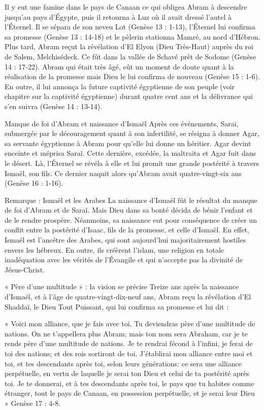 Il y eut une famine dans le pays de Canaan ce qui obligea Abram à descendre jusqu'au pays d’Égypte, puis il retourna à Luz où il avait dressé l'autel à l’Éternel. Il se sépara de son neveu Lot (Genèse 13 : 1-13), l’Éternel lui confirma sa promesse (Genèse 13 : 14-18) et le pèlerin stationna Mamré, au nord d'Hébron. Plus tard, Abram reçut la révélation d'El Elyon (Dieu Très-Haut) auprès du roi de Salem, Melchisédeck. Ce fût dans la vallée de Schavé prêt de Sodome (Genèse 14 : 17-22).
Abram qui était très âgé, eût un moment de doute quant à la réalisation de la promesse mais Dieu le lui confirma de nouveau (Genèse 15 : 1-6). En outre, il lui annonça la future captivité égyptienne de son peuple (voir chapitre sur la captivité égyptienne) durant quatre cent ans et la délivrance qui s'en suivra (Genèse 14 : 13-14).

Manque de foi d'Abram et naissance d'Ismaël
Après ces événements, Saraï, submergée par le découragement quant à son infertilité, se résigna à donner Agar, sa servante égyptienne à Abram pour qu'elle lui donne un héritier. Agar devint enceinte et méprisa Saraï. Cette dernière, excédée, la maltraita et Agar fuit dans le désert. Là, l’Éternel se révéla à elle et lui promit une grande postérité à travers Ismaël, son fils. Ce dernier naquit alors qu'Abram avait quatre-vingt-six ans (Genèse 16 : 1-16).

Remarque : Ismaël et les Arabes
La naissance d'Ismaël fût le résultat du manque de foi d'Abram et de Saraï. Mais Dieu dans sa bonté décida de bénir l'enfant et de le rendre prospère. Néanmoins, sa naissance eut pour conséquence de créer un conflit entre la postérité d'Isaac, fils de la promesse, et celle d'Ismaël. En effet, Ismaël est l'ancêtre des Arabes, qui sont aujourd'hui majoritairement hostiles envers les hébreux. En outre, ils créèrent l'islam, une religion en totale inadéquation avec les vérités de l’Évangile et qui n'accepte pas la divinité de Jésus-Christ.

« Père d'une multitude » : la vision se précise
Treize ans après la naissance d'Ismaël, et à l'âge de quatre-vingt-dix-neuf ans, Abram reçu la révélation d'El Shaddaï, le Dieu Tout Puissant, qui lui confirma sa promesse et lui dit :

« Voici mon alliance, que je fais avec toi. Tu deviendras père d'une multitude de nations. On ne t'appellera plus Abram; mais ton nom sera Abraham, car je te rends père d'une multitude de nations. Je te rendrai fécond à l'infini, je ferai de toi des nations; et des rois sortiront de toi. J'établirai mon alliance entre moi et toi, et tes descendants après toi, selon leurs générations: ce sera une alliance perpétuelle, en vertu de laquelle je serai ton Dieu et celui de ta postérité après toi. Je te donnerai, et à tes descendants après toi, le pays que tu habites comme étranger, tout le pays de Canaan, en possession perpétuelle, et je serai leur Dieu » Genèse 17 : 4-8.

